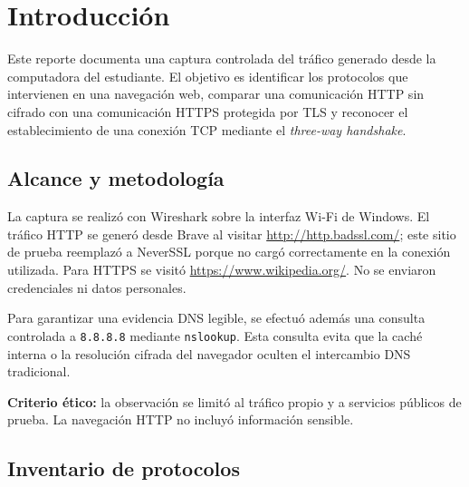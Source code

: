\documentclass[11pt,a4paper]{article}
\newcommand{\infobox}[1]{%
  \noindent\colorbox{fondo}{\parbox{\dimexpr\textwidth-2\fboxsep}{#1}}}
\newcommand{\reportpage}{%
  \clearpage
  \thispagestyle{fancy}}
\begin{document}
\reportpage
\section*{Introducción}

Este reporte documenta una captura controlada del tráfico generado desde la computadora del estudiante. El objetivo es identificar los protocolos que intervienen en una navegación web, comparar una comunicación HTTP sin cifrado con una comunicación HTTPS protegida por TLS y reconocer el establecimiento de una conexión TCP mediante el \textit{three-way handshake}.

\subsection*{Alcance y metodología}

La captura se realizó con Wireshark sobre la interfaz Wi-Fi de Windows. El tráfico HTTP se generó desde Brave al visitar \url{http://http.badssl.com/}; este sitio de prueba reemplazó a NeverSSL porque no cargó correctamente en la conexión utilizada. Para HTTPS se visitó \url{https://www.wikipedia.org/}. No se enviaron credenciales ni datos personales.

Para garantizar una evidencia DNS legible, se efectuó además una consulta controlada a \texttt{8.8.8.8} mediante \texttt{nslookup}. Esta consulta evita que la caché interna o la resolución cifrada del navegador oculten el intercambio DNS tradicional.

\infobox{\textcolor{azul}{\textbf{Criterio ético:}} la observación se limitó al tráfico propio y a servicios públicos de prueba. La navegación HTTP no incluyó información sensible.}

\subsection*{Inventario de protocolos}
\end{document}
